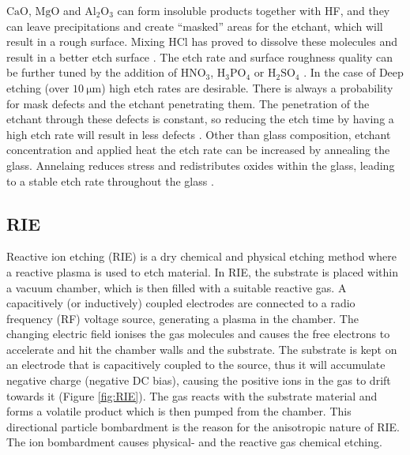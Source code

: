 \documentclass[final]{jyflluk}
\begin{document}
$\mathrm{CaO}$, $\mathrm{MgO}$ and $\mathrm{Al_2 O_3}$ can form insoluble products together with HF, and they can leave precipitations and create “masked” areas for the etchant, which will result in a rough surface. Mixing HCl has proved to dissolve these molecules and result in a better etch surface \cite{iliescu2005characterization}. The etch rate and surface roughness quality can be further tuned by the addition of $\mathrm{HNO_3}$, $\mathrm{H_3 PO_4 }$  or $\mathrm{H_2SO_4}$ \cite{park2017review}. In the case of Deep etching (over $\SI{10}{\micro \metre}$) high etch rates are desirable. There is always a probability for mask defects and the etchant penetrating them. The penetration of the etchant through these defects is constant, so reducing the etch time by having a high etch rate will result in less defects \cite{tay2006defect}. Other than glass composition, etchant concentration and applied heat the etch rate can be increased by annealing the glass. Annelaing reduces stress and redistributes oxides within the glass, leading to a stable etch rate throughout the glass \cite{iliescu2005THOROUGH}.





\label{sec:xx5}
\subsection{RIE}
Reactive ion etching (RIE) is a dry chemical and physical etching method where a reactive plasma is used to etch material. In RIE, the substrate is placed within a vacuum chamber, which is then filled with a suitable reactive gas. A capacitively (or inductively) coupled electrodes are connected to a radio frequency (RF) voltage source, generating a plasma in the chamber. The changing electric field ionises the gas molecules and causes the free electrons to accelerate and hit the chamber walls and the substrate.  The substrate is kept on an electrode that is capacitively coupled to the source, thus it will accumulate negative charge (negative DC bias), causing the positive ions in the gas to drift towards it (Figure \ref{fig:RIE}). The gas reacts with the substrate material and forms a volatile product which is then pumped from the chamber. This directional particle bombardment is the reason for the anisotropic nature of RIE. The ion bombardment causes physical-  and the reactive gas chemical etching. \cite{Franssila2008}
\end{document}

